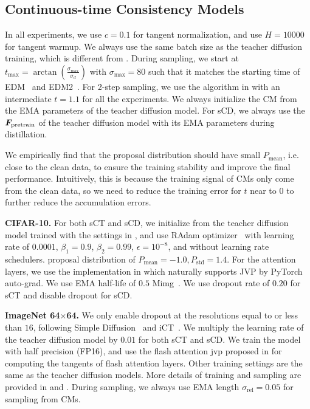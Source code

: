 \subsection{Continuous-time Consistency Models}
In all experiments, we use $c=0.1$ for tangent normalization, and use $H=10000$ for tangent warmup. We always use the same batch size as the teacher diffusion training, which is different from \citet{song2023ict}. During sampling, we start at $t_{\text{max}}=\arctan\left(\frac{\sigma_{\text{max}}}{\sigma_d}\right)$ with $\sigma_{\text{max}}=80$ such that it matches the starting time of EDM~\citep{karras2022edm} and EDM2~\citep{karras2024edm2}. For 2-step sampling, we use the algorithm in \citet{song2023cm} with an intermediate $t=1.1$ for all the experiments. We always initialize the CM from the EMA parameters of the teacher diffusion model. For sCD, we always use the ${\bm{F}}_{\text{pretrain}}$ of the teacher diffusion model with its EMA parameters during distillation.

We empirically find that the proposal distribution should have small $P_{\text{mean}}$, i.e. close to the clean data, to ensure the training stability and improve the final performance. Intuitively, this is because the training signal of CMs only come from the clean data, so we need to reduce the training error for $t$ near to $0$ to further reduce the accumulation errors.

\textbf{CIFAR-10. }
For both sCT and sCD, we initialize from the teacher diffusion model trained with the settings in , and use RAdam optimizer~\citep{liu2019radam} with learning rate of $0.0001$, $\beta_1=0.9$, $\beta_2=0.99$, $\epsilon=10^{-8}$, and without learning rate schedulers.  proposal distribution of $P_{\text{mean}}=-1.0, P_{\text{std}}=1.4$. For the attention layers, we use the implementation in \citep{karras2022edm} which naturally supports JVP by PyTorch~\citep{paszke2019pytorch} auto-grad. We use EMA half-life of $0.5$ Mimg~\citep{karras2022edm}. We use dropout rate of $0.20$ for sCT and disable dropout for sCD.

\textbf{ImageNet 64$\times$64. }
We only enable dropout at the resolutions equal to or less than $16$, following Simple Diffusion~\citep{hoogeboom2023simple} and iCT~\citep{song2023ict}. We multiply the learning rate of the teacher diffusion model by $0.01$ for both sCT and sCD. We train the model with half precision (FP16), and use the flash attention jvp proposed in  for computing the tangents of flash attention layers. Other training settings are the same as the teacher diffusion models. More details of training and sampling are provided in  and . During sampling, we always use EMA length $\sigma_{\text{rel}}=0.05$ for sampling from CMs.

